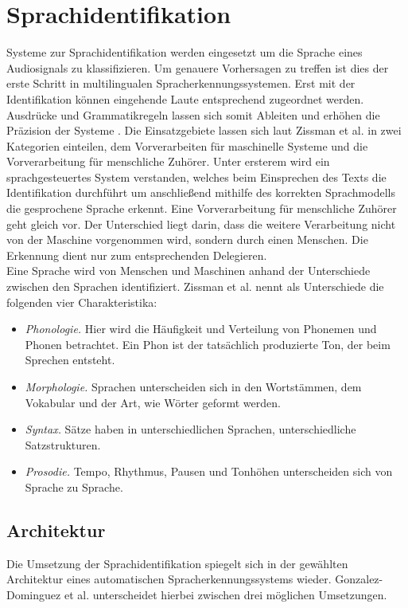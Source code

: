 \section{Sprachidentifikation}
Systeme zur Sprachidentifikation werden eingesetzt um die Sprache eines Audiosignals zu klassifizieren. Um genauere Vorhersagen zu treffen ist dies der erste Schritt in multilingualen Spracherkennungssystemen. Erst mit der Identifikation können eingehende Laute entsprechend zugeordnet werden. Ausdrücke und Grammatikregeln lassen sich somit Ableiten und erhöhen die Präzision der Systeme \cite{Bartz.2017}.
Die Einsatzgebiete lassen sich laut Zissman et al. \cite{Zissman.2001} in zwei Kategorien einteilen, dem Vorverarbeiten für maschinelle Systeme und die Vorverarbeitung für menschliche Zuhörer. Unter ersterem wird ein sprachgesteuertes System verstanden, welches beim Einsprechen des Texts die Identifikation durchführt um anschließend mithilfe des korrekten Sprachmodells die gesprochene Sprache erkennt. Eine Vorverarbeitung für menschliche Zuhörer geht gleich vor. Der Unterschied liegt darin, dass die weitere Verarbeitung nicht von der Maschine vorgenommen wird, sondern durch einen Menschen. Die Erkennung dient nur zum entsprechenden Delegieren.  
\\
Eine Sprache wird von Menschen und Maschinen anhand der Unterschiede zwischen den Sprachen identifiziert. Zissman et al. \cite{Zissman.2001} nennt als Unterschiede die folgenden vier Charakteristika:
\begin{itemize}
\item \textit{Phonologie.} Hier wird die Häufigkeit und Verteilung von Phonemen und Phonen betrachtet. Ein Phon ist der tatsächlich produzierte Ton, der beim Sprechen entsteht.
\item \textit{Morphologie.} Sprachen unterscheiden sich in den Wortstämmen, dem Vokabular und der Art, wie Wörter geformt werden.
\item \textit{Syntax.} Sätze haben in unterschiedlichen Sprachen, unterschiedliche Satzstrukturen.
\item \textit{Prosodie.} Tempo, Rhythmus, Pausen und Tonhöhen unterscheiden sich von Sprache zu Sprache.
\end{itemize}

\subsection{Architektur}
Die Umsetzung der Sprachidentifikation spiegelt sich in der gewählten Architektur eines automatischen Spracherkennungssystems wieder. Gonzalez-Dominguez et al. \cite{Gonzalez.2015} unterscheidet hierbei zwischen drei möglichen Umsetzungen.

